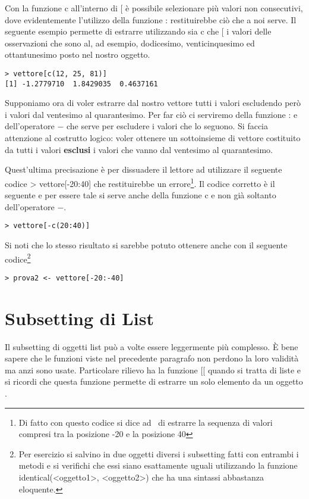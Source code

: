 Con la funzione \textsf{c} all'interno di \textsf{[} è possibile selezionare più valori non consecutivi, dove evidentemente l'utilizzo della funzione \textsf{:} restituirebbe ciò che a noi serve. Il seguente esempio permette di estrarre utilizzando sia \textsf{c} che \textsf{[} i valori delle osservazioni che sono al, ad esempio, dodicesimo, venticinquesimo ed ottantunesimo posto nel nostro oggetto.

\begin{lstlisting}
> vettore[c(12, 25, 81)]
[1] -1.2779710  1.8429035  0.4637161
\end{lstlisting}

Supponiamo ora di voler estrarre dal nostro vettore tutti i valori escludendo però i valori dal ventesimo al quarantesimo. Per far ciò ci serviremo della funzione \textsf{:} e dell'operatore \textsf{$-$} che serve per escludere i valori che lo seguono. Si faccia attenzione al costrutto logico: voler ottenere un sottoinsieme di \textsf{vettore} costituito da tutti i valori \textbf{esclusi} i valori che vanno dal ventesimo al quarantesimo.

Quest'ultima precisazione è per dissuadere il lettore ad utilizzare il seguente codice \textsf{> vettore[-20:40]} che restituirebbe un errore\footnote{Di fatto con questo codice si dice ad \erre\ di estrarre la sequenza di valori compresi tra la posizione -20 e la posizione 40}. Il codice corretto è il seguente e per essere tale si serve anche della funzione \textsf{c} e non già soltanto dell'operatore \textsf{$-$}.

\begin{lstlisting}
> vettore[-c(20:40)]
\end{lstlisting}

Si noti che lo stesso risultato si sarebbe potuto ottenere anche con il seguente codice\footnote{Per esercizio si salvino in due oggetti diversi i subsetting fatti con entrambi i metodi e si verifichi che essi siano esattamente uguali utilizzando la funzione \textsf{identical(<oggetto1>, <oggetto2>)} che ha una sintassi abbastanza eloquente.}
\begin{lstlisting}
> prova2 <- vettore[-20:-40]
\end{lstlisting}

\section{Subsetting di List}

Il subsetting di oggetti list può a volte essere leggermente più complesso. È bene sapere che le funzioni viste nel precedente paragrafo non perdono la loro validità ma anzi sono usate. Particolare rilievo ha la funzione \textsf{[[} quando si tratta di liste e si ricordi che questa funzione permette di estrarre un solo elemento da un oggetto \erre.

